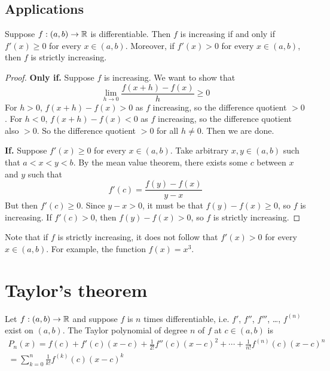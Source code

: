 \subsection{Applications}
\begin{theorem}
  Suppose $f: (a, b) \to \mathbb{R}$ is differentiable. Then $f$ is increasing if and only if $f'(x) \geq 0$ for every $x \in (a, b)$. Moreover, if $f'(x) > 0$ for every $x \in (a, b)$, then $f$ is strictly increasing.
\end{theorem}
\begin{proof}
  \textbf{Only if.} Suppose $f$ is increasing. We want to show that
  \[
    \lim_{h \to 0} \frac{f(x + h) - f(x)}{h} \geq 0
  \]
  For $h > 0$, $f(x + h) - f(x) > 0$ as $f$ increasing, so the difference quotient $> 0$. For $h < 0$, $f(x + h) - f(x) < 0$ as $f$ increasing, so the difference quotient also $> 0$. So the difference quotient $> 0$ for all $h \neq 0$. Then we are done.
  
  \textbf{If.} Suppose $f'(x) \geq 0$ for every $x \in (a, b)$. Take arbitrary $x, y \in (a, b)$ such that $a < x < y < b$. By the mean value theorem, there exists some $c$ between $x$ and $y$ such that
  \[
    f'(c) = \frac{f(y) - f(x)}{y - x}
  \]
  But then $f'(c) \geq 0$. Since $y - x > 0$, it must be that $f(y) - f(x) \geq 0$, so $f$ is increasing. If $f'(c) > 0$, then $f(y) - f(x) > 0$, so $f$ is strictly increasing.
\end{proof}
Note that if $f$ is strictly increasing, it does not follow that $f'(x) > 0$ for every $x \in (a, b)$. For example, the function $f(x) = x ^ 3$.


\section{Taylor's theorem}

\begin{definition}
  Let $f: (a, b) \to \mathbb{R}$ and suppose $f$ is $n$ times differentiable, i.e. $f'$, $f''$, $f'''$, \ldots, $f ^ {(n)}$ exist on $(a, b)$. The Taylor polynomial of degree $n$ of $f$ at $c \in (a, b)$ is
  \begin{gather*}
    P_n(x) = f(c) + f'(c)(x - c) + \frac{1}{2!} f''(c) (x - c) ^ 2 + \cdots + \frac{1}{n!} f ^ {(n)} (c) (x - c) ^ n \\ 
    = \sum_{k = 0}^{n} \frac{1}{k!} f ^ {(k)} (c) (x - c) ^ k
  \end{gather*}
\end{definition}

